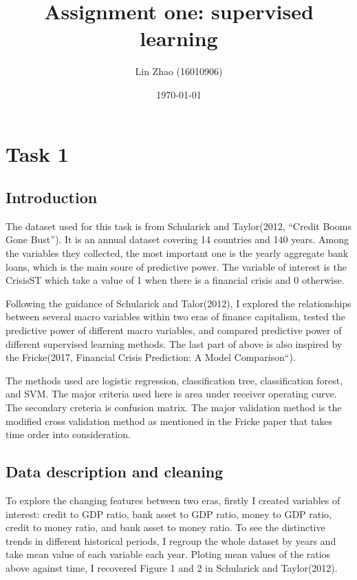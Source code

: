 \documentclass{article}
\begin{document}
\title{Assignment one: supervised learning}
\author{Lin Zhao (16010906)}
\date{\today}
\maketitle

\newpage

\section*{Task 1}

\subsection*{Introduction}

The dataset used for this task is from Schularick and Taylor(2012,
``Credit Booms Gone Bust''). It is an annual dataset covering 14
countries and 140 years. Among the variables they collected, the most
important one is the yearly aggregate bank loans, which is 
the main soure of predictive power. The variable of interest is the
CrisisST which take a value of 1 when there is a financial crisis and 0
otherwise.

Following the guidance of Schularick and Talor(2012), I explored the
relationships between several macro variables within two
eras of finance capitalism, tested the predictive power of different
macro variables, and compared predictive power of different supervised
learning methods. The last part of above is also inspired by the
Fricke(2017, Financial Crisis Prediction: A Model Comparison``). 

The methods used are logistic regression, classification
tree, classification forest, and SVM. The major criteria
used here is area under receiver operating curve. The secondary creteria
is confusion matrix. The major validation method is the modified cross
validation method  as mentioned in the Fricke paper that takes time order into
consideration.

\subsection*{Data description and cleaning}

To explore the changing features between two eras, firstly I created
variables of interest: credit to GDP ratio, bank asset to GDP ratio,
money to GDP ratio, credit to money ratio, and bank asset to money
ratio. To see the distinctive trends in different historical periods, I
regroup the whole dataset by years and take mean value of each variable
each year. Ploting mean values of the ratios above against time, I
recovered Figure 1 and 2 in Schularick and Taylor(2012).
\end{document}
